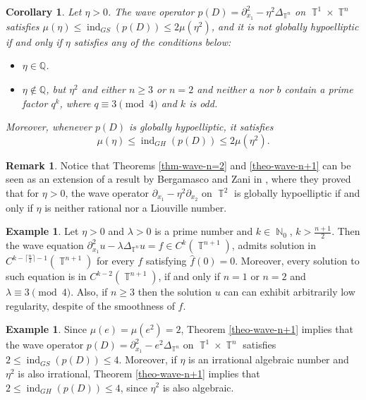 \documentclass[11pt]{amsart}
\numberwithin{equation}{section}
\newtheorem{corollary}[theorem]{Corollary}
\theoremstyle{definition}
\newtheorem{remark}[theorem]{Remark}
\newtheorem{example}[theorem]{Example}
\DeclareMathOperator{\N}{\mathbb{N}}
\DeclareMathOperator{\T}{\mathbb{T}}
\begin{document}
\begin{corollary}
     Let $\eta >0$. The wave operator $p(D)=\partial_{x_1}^2-\eta^2\Delta_{\T^n}$ on $\T^1\times\T^n$ satisfies  $\mu(\eta)\leq \operatorname{ind}_{GS}(p(D))\leq 2\mu(\eta^2)$, and it is not globally hypoelliptic if and only if $\eta$ satisfies any of the conditions below:
     \begin{itemize}
         \item[{\it (i)}] $\eta\in\mathbb{Q}$.
         \item[{\it (ii)}] $\eta\not\in\mathbb{Q}$, but $\eta^2$ and either $n\geq 3$ or $n=2$ and neither $a$ nor $b$ contain a prime factor $q^k$, where $q\equiv 3 \pmod 4$ and $k$ is odd.
     \end{itemize}
     Moreover, whenever $p(D)$ is globally hypoelliptic, it satisfies \[\mu(\eta)\leq \operatorname{ind}_{GH}(p(D))\leq 2\mu(\eta^2).\]
\end{corollary}
\begin{remark}
    Notice that Theorems \ref{thm-wave-n=2} and \ref{theo-wave-n+1} can be seen as an extension of a result by Bergamasco and Zani in \cite{bergamasco-second-order}, where they proved that for $\eta>0$, the wave operator $\partial_{x_1}-\eta^2\partial_{x_2}$ on $\T^2$ is globally hypoelliptic if and only if $\eta$ is neither rational nor a Liouville number.
\end{remark} 
\begin{example}
    Let $\eta>0$ and $\lambda>0$ is a prime number and $k\in\N_0$, $k>\frac{n+1}{2}$. Then the wave equation $\partial_{x_1}^2u-\lambda\Delta_{\T^n}u=f\in C^{k}(\T^{n+1})$, admits solution in $C^{k-\lceil \frac{n}{2}\rceil-1}(\T^{n+1})$ for every $f$ satisfying  $\widehat{f}(0)=0$. Moreover, every solution to such equation is in $C^{k-2}(\T^{n+1})$,  if and only if $n=1$ or $n=2$ and $\lambda\equiv3 \pmod 4$. Also, if $n\geq 3$ then the solution $u$ can can exhibit arbitrarily low regularity, despite of the smoothness of $f$.
\end{example}
\begin{example}
    Since $\mu(e)=\mu(e^2)=2$, Theorem \ref{theo-wave-n+1} implies that the wave operator $p(D)=\partial_{x_1}^2-e^2\Delta_{\T^n}$ on $\T^{1}\times\T^n$ satisfies  $2\leq \operatorname{ind}_{GS}(p(D))\leq 4$. Moreover, if $\eta$ is an irrational algebraic number and $\eta^2$ is also irrational, Theorem \ref{theo-wave-n+1} implies that $2\leq \operatorname{ind}_{GH}(p(D))\leq 4$, since $\eta^2$ is also algebraic.
\end{example}


\end{document}
